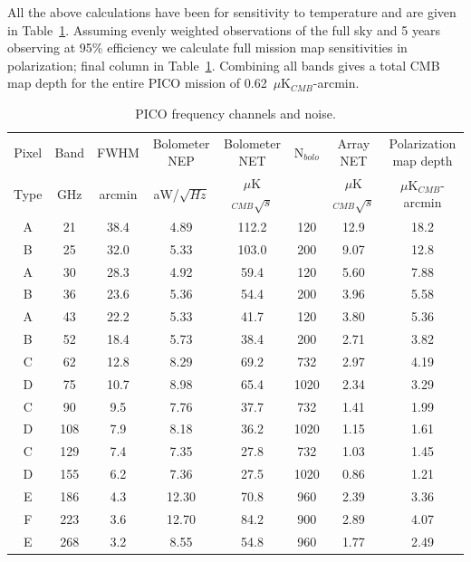 \documentclass[]{spie}  %
\begin{document}
All the above calculations have been for sensitivity to temperature and are given in Table~\ref{tab:noise}.  Assuming evenly weighted observations 
of the full sky and 5 years observing at 95\% efficiency we calculate full mission map sensitivities in polarization; final column in Table~\ref{tab:noise}.
Combining all bands gives a total CMB map depth for the entire PICO mission of 0.62~$\mu$K$_{CMB}$-arcmin.

\begin{table}[ht]
\centering
\caption{PICO frequency channels and noise. }
\label{tab:noise}
\begin{tabular}{|c|c|c|c|c|c|c|c|}
\hline
Pixel  & Band  & FWHM   & Bolometer NEP & Bolometer NET        & N$_{bolo}$ & Array NET            & Polarization map depth  \\
Type   & GHz   & arcmin & aW/$\sqrt{Hz}$ & $\mu$K$_{CMB}\sqrt{s}$ &           & $\mu$K$_{CMB}\sqrt{s}$ & $\mu$K$_{CMB}$-arcmin      \\ \hline
A     & 21  & 38.4 & 4.89  & 112.2   & 120   & 12.9  & 18.2  \\
B     & 25  & 32.0 & 5.33  & 103.0   & 200   & 9.07   & 12.8  \\
A     & 30  & 28.3 & 4.92  & 59.4    & 120   & 5.60   & 7.88   \\
B     & 36  & 23.6 & 5.36  & 54.4    & 200   & 3.96   & 5.58   \\
A     & 43  & 22.2 & 5.33  & 41.7    & 120   & 3.80   & 5.36   \\
B     & 52  & 18.4 & 5.73  & 38.4    & 200   & 2.71   & 3.82   \\
C     & 62  & 12.8 & 8.29  & 69.2    & 732   & 2.97   & 4.19   \\
D     & 75  & 10.7 & 8.98  & 65.4    & 1020  & 2.34   & 3.29   \\
C     & 90  & 9.5  & 7.76  & 37.7    & 732   & 1.41   & 1.99   \\
D     & 108 & 7.9  & 8.18  & 36.2    & 1020  & 1.15   & 1.61   \\
C     & 129 & 7.4  & 7.35  & 27.8    & 732   & 1.03   & 1.45   \\
D     & 155 & 6.2  & 7.36  & 27.5    & 1020  & 0.86   & 1.21   \\
E     & 186 & 4.3  & 12.30 & 70.8    & 960   & 2.39   & 3.36   \\
F     & 223 & 3.6  & 12.70 & 84.2    & 900   & 2.89   & 4.07   \\
E     & 268 & 3.2  & 8.55  & 54.8    & 960   & 1.77   & 2.49   \\

\end{tabular}
\end{table}
\end{document}
